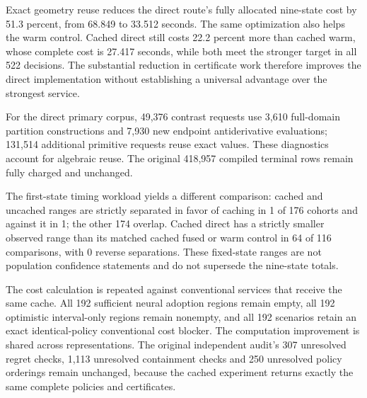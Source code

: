 Exact geometry reuse reduces the direct route's fully allocated nine-state cost by 51.3 percent, from 68.849 to 33.512 seconds. The same optimization also helps the warm control. Cached direct still costs 22.2 percent more than cached warm, whose complete cost is 27.417 seconds, while both meet the stronger target in all 522 decisions. The substantial reduction in certificate work therefore improves the direct implementation without establishing a universal advantage over the strongest service.

For the direct primary corpus, 49,376 contrast requests use 3,610 full-domain partition constructions and 7,930 new endpoint antiderivative evaluations; 131,514 additional primitive requests reuse exact values. These diagnostics account for algebraic reuse. The original 418,957 compiled terminal rows remain fully charged and unchanged.

The first-state timing workload yields a different comparison: cached and uncached ranges are strictly separated in favor of caching in 1 of 176 cohorts and against it in 1; the other 174 overlap. Cached direct has a strictly smaller observed range than its matched cached fused or warm control in 64 of 116 comparisons, with 0 reverse separations. These fixed-state ranges are not population confidence statements and do not supersede the nine-state totals.

The cost calculation is repeated against conventional services that receive the same cache. All 192 sufficient neural adoption regions remain empty, all 192 optimistic interval-only regions remain nonempty, and all 192 scenarios retain an exact identical-policy conventional cost blocker. The computation improvement is shared across representations. The original independent audit's 307 unresolved regret checks, 1,113 unresolved containment checks and 250 unresolved policy orderings remain unchanged, because the cached experiment returns exactly the same complete policies and certificates.
